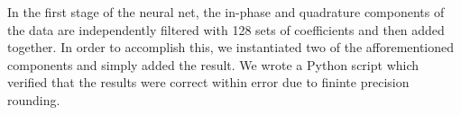   In the first stage of the neural net, the in-phase and quadrature components of the data are independently filtered with 128 sets of coefficients and then added together.  In order to accomplish this, we instantiated two of the afforementioned components and simply added the result.  We wrote a Python script which verified that the results were correct within error due to fininte precision rounding.
